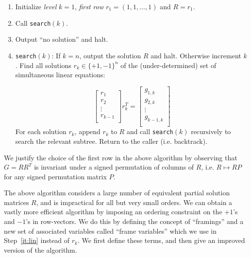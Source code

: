 \documentclass[11pt,a4paper]{article}
\begin{document}
\begin{enumerate}
\item Initialize \emph{level} $k=1$, \emph{first row} 
$r_1= (1,1,\ldots, 1)$ and $R=r_1$.  

\item Call {\tt search}$(k)$.

\item Output ``no solution'' and halt.

\item {\tt search}$(k)$: \label{it:lin}
If $k=n$, output the solution $R$ and halt.  
Otherwise increment $k$. Find all solutions 
$r_k \in \{+1,-1\}^n$
of the (under-determined) 
set of simultaneous linear equations:

\begin{equation*}
\left[
\begin{matrix}
r_1\\r_2\\ \vdots \\r_{k-1}\\
\end{matrix}
\right] r_k^T = \left[
\begin{matrix}
g_{1,k}\\g_{2,k}\\ \vdots \\ g_{k-1,k}\\
\end{matrix} \right]
\end{equation*}
For each solution $r_k$, append $r_{k}$ to $R$ 
and call {\tt search}$(k)$ recursively to search the relevant subtree.
Return to the caller (i.e. backtrack). 
\end{enumerate}

We justify the choice of the first row in the above algorithm by observing
that $G = RR^T$ is invariant under a signed permutation of columns
of $R$, i.e. $R \mapsto RP$ for any signed permutation matrix $P$. 
 
The above algorithm considers a large number of equivalent partial solution
matrices $R$, and is impractical for all but very small orders.  We can
obtain a vastly more efficient algorithm by imposing an ordering constraint
on the $+1$'s and $-1$'s in row-vectors.  
We do this by defining the concept of ``framings'' and a new set of associated
variables called ``frame variables'' which we use in Step~\ref{it:lin} instead
of $r_{k}$.  We first define these terms, and then give an improved
version of the algorithm.
 
\end{document}
